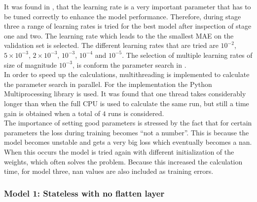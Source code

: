 It was found in \cite{Greff2017}, that the learning rate is a very important parameter that has to be tuned correctly to enhance the model performance. Therefore, during stage three a range of learning rates is tried for the best model after inspection of stage one and two. The learning rate which leads to the the smallest MAE on the validation set is selected. The different learning rates that are tried are $ 10^{-2} $, $ 5\times10^{-3} $, $ 2\times10^{-3} $, $ 10^{-3} $, $ 10^{-4} $ and $ 10^{-5} $. The selection of multiple learning rates of size of magnitude $ 10^{-3} $, is conform the parameter search in \cite{Shi2018}.\\

In order to speed up the calculations, multithreading is implemented to calculate the parameter search in parallel. For the implementation the Python Multiprocessing library is used. It was found that one thread takes considerably longer than when the full CPU is used to calculate the same run, but still a time gain is obtained when a total of $ 4 $ runs is considered.\\

The importance of setting good parameters is stressed by the fact that for certain parameters the loss during training becomes ``not a number''. This is because the model becomes unstable and gets a very big loss which eventually becomes a nan. When this occurs the model is tried again with different initialization of the weights, which often solves the problem. Because this increased the calculation time, for model three, nan values are also included as training errors.


\subsubsection{Model 1: Stateless with no flatten layer}

